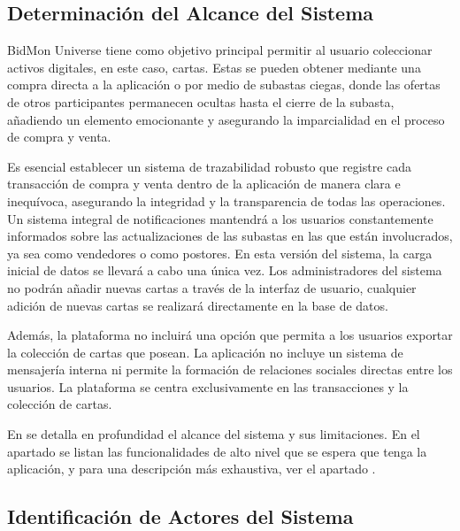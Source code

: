 \subsection{Determinación del Alcance del Sistema}
BidMon Universe tiene como objetivo principal permitir al usuario coleccionar activos digitales, en este caso, cartas. Estas se pueden obtener mediante una compra directa a la aplicación o 
por medio de subastas ciegas, donde las ofertas de otros participantes permanecen ocultas hasta el cierre de la subasta, añadiendo un elemento emocionante 
y asegurando la imparcialidad en el proceso de compra y venta. 

Es esencial establecer un sistema de trazabilidad robusto que registre cada transacción de compra y venta dentro de la aplicación de manera clara e inequívoca, asegurando la integridad y 
la transparencia de todas las operaciones. Un sistema integral de notificaciones mantendrá a los usuarios constantemente informados sobre las actualizaciones de las subastas en las que están involucrados, 
ya sea como vendedores o como postores.
En esta versión del sistema, la carga inicial de datos se llevará a cabo una única vez. Los administradores del sistema no podrán añadir nuevas cartas a través de la interfaz de usuario, 
cualquier adición de nuevas cartas se realizará directamente en la base de datos. 

Además, la plataforma no incluirá una opción que permita a los usuarios exportar la colección de cartas que posean.
La aplicación no incluye un sistema de mensajería interna ni permite la formación de relaciones sociales directas entre los usuarios. 
La plataforma se centra exclusivamente en las transacciones y la colección de cartas.

En  se detalla en profundidad el alcance del sistema y sus limitaciones.
En el apartado  se listan las 
funcionalidades de alto nivel que se espera que tenga la aplicación, y para una descripción más exhaustiva, 
ver el apartado .


\subsection{Identificación de Actores del Sistema} \label{sec:6_1-Identificacion_actores}
\hypertarget{sec:6_1-Identificacion_actores}{}


